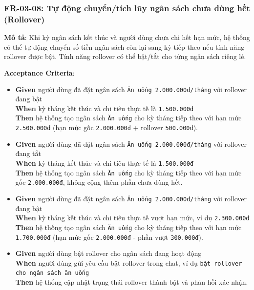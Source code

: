 \subsubsection{FR-03-08: Tự động chuyển/tích lũy ngân sách chưa dùng hết (Rollover)}

\textbf{Mô tả}: Khi kỳ ngân sách kết thúc và người dùng chưa chi hết hạn mức, hệ thống có thể tự động chuyển số tiền ngân sách còn lại sang kỳ tiếp theo nếu tính năng rollover được bật. Tính năng rollover có thể bật/tắt cho từng ngân sách riêng lẻ.



\textbf{Acceptance Criteria}:

\begin{itemize}
\item \textbf{Given} người dùng đã đặt ngân sách \texttt{Ăn uống 2.000.000đ/tháng} với rollover đang bật  \\ \hspace*{1.5em}  \textbf{When} kỳ tháng kết thúc và chi tiêu thực tế là \texttt{1.500.000đ}  \\ \hspace*{1.5em}  \textbf{Then} hệ thống tạo ngân sách \texttt{Ăn uống} cho kỳ tháng tiếp theo với hạn mức \texttt{2.500.000đ} (hạn mức gốc \texttt{2.000.000đ} + rollover \texttt{500.000đ}).
\item \textbf{Given} người dùng đã đặt ngân sách \texttt{Ăn uống 2.000.000đ/tháng} với rollover đang tắt  \\ \hspace*{1.5em}  \textbf{When} kỳ tháng kết thúc và chi tiêu thực tế là \texttt{1.500.000đ}  \\ \hspace*{1.5em}  \textbf{Then} hệ thống tạo ngân sách \texttt{Ăn uống} cho kỳ tháng tiếp theo với hạn mức gốc \texttt{2.000.000đ}, không cộng thêm phần chưa dùng hết.
\item \textbf{Given} người dùng đã đặt ngân sách \texttt{Ăn uống 2.000.000đ/tháng} với rollover đang bật  \\ \hspace*{1.5em}  \textbf{When} kỳ tháng kết thúc và chi tiêu thực tế vượt hạn mức, ví dụ \texttt{2.300.000đ}  \\ \hspace*{1.5em}  \textbf{Then} hệ thống tạo ngân sách \texttt{Ăn uống} cho kỳ tháng tiếp theo với hạn mức \texttt{1.700.000đ} (hạn mức gốc \texttt{2.000.000đ} - phần vượt \texttt{300.000đ}).
\item \textbf{Given} người dùng bật rollover cho ngân sách đang hoạt động  \\ \hspace*{1.5em}  \textbf{When} người dùng gửi yêu cầu bật rollover trong chat, ví dụ \texttt{bật rollover cho ngân sách ăn uống}  \\ \hspace*{1.5em}  \textbf{Then} hệ thống cập nhật trạng thái rollover thành bật và phản hồi xác nhận.

\end{itemize}
